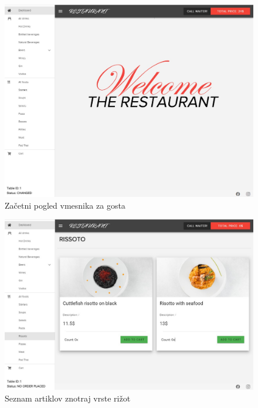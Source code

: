 \documentclass[a4paper, 12pt]{book}
\begin{document}
\begin{figure}[!htb]
\centering
\includegraphics[width=13.7cm]{gost_zacetek.jpg}
\caption{Začetni pogled vmesnika za gosta}
\label{Gost_zac}
\end{figure}

\begin{figure}[!htb]
\centering
\includegraphics[width=13.5cm]{customer_1.jpg}
\caption{Seznam artiklov znotraj vrste rižot}
\label{Gost_3}
\end{figure}
\end{document}
